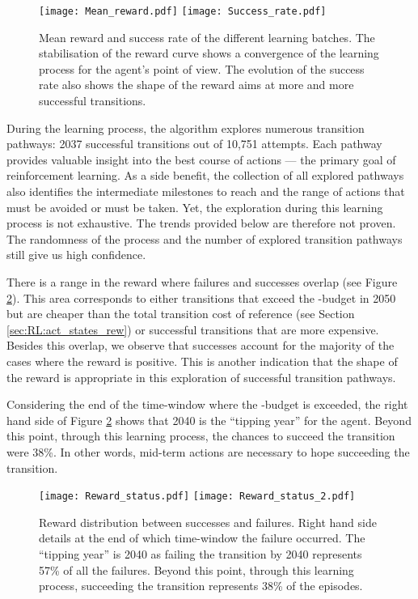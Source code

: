 \begin{figure}[!htbp]
\centering
\texttt{[image: Mean\_reward.pdf]}
\texttt{[image: Success\_rate.pdf]}
\caption{Mean reward and success rate of the different learning batches. The stabilisation of the reward curve shows a convergence of the learning process for the agent's point of view. The evolution of the success rate also shows the shape of the reward aims at more and more successful transitions.}
\label{fig:reward_success}
\end{figure}

During the learning process, the algorithm explores numerous transition pathways: 2037 successful transitions out of 10,751 attempts. Each pathway provides valuable insight into the best course of actions --- the primary goal of reinforcement learning. As a side benefit, the collection of all explored pathways also identifies the intermediate milestones to reach and the range of actions that must be avoided or must be taken. Yet, the exploration during this learning process is not exhaustive. The trends provided below are therefore not proven. The randomness of the process and the number of explored transition pathways still give us high confidence.

There is a range in the reward where failures and successes overlap (see Figure \ref{fig:reward_status}). This area corresponds to either transitions that exceed the -budget in 2050 but are cheaper than the total transition cost of reference (see Section \ref{sec:RL:act_states_rew}) or successful transitions that are more expensive. Besides this overlap, we observe that successes account for the majority of the cases where the reward is positive. This is another indication that the shape of the reward is appropriate in this exploration of successful transition pathways.

Considering the end of the time-window where the -budget is exceeded, the right hand side of Figure \ref{fig:reward_status} shows that 2040 is the ``tipping year'' for the agent. Beyond this point, through this learning process, the chances to succeed the transition were 38\%. In other words, mid-term actions are necessary to hope succeeding the transition.

\begin{figure}[!htbp]
\centering
\texttt{[image: Reward\_status.pdf]}
\texttt{[image: Reward\_status\_2.pdf]}
\caption{Reward distribution between successes and failures. Right hand side details at the end of which time-window the failure occurred. The ``tipping year'' is 2040 as failing the transition by 2040 represents 57\% of all the failures. Beyond this point, through this learning process, succeeding the transition represents 38\% of the episodes.}
\label{fig:reward_status}
\end{figure}

